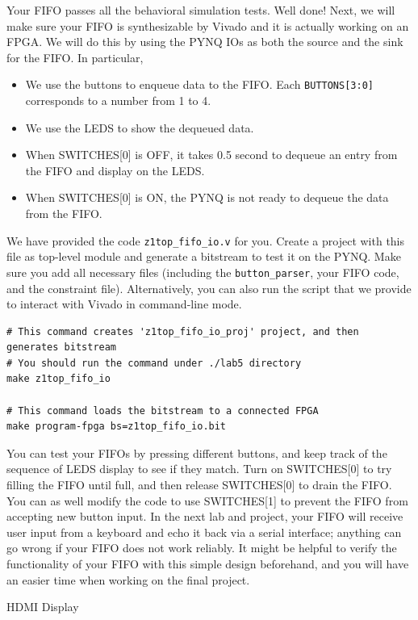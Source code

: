 \documentclass[11pt]{article}
\makeatletter
\renewcommand{\section}
{\@startsection {section}{1}{0pt}
 {-2ex}
 {1ex}
 {\bfseries\Large}}
\makeatother
\begin{document}
Your FIFO passes all the behavioral simulation tests. Well done! Next, we will make sure your FIFO is synthesizable by Vivado and it is actually working on an FPGA. We will do this by using the PYNQ IOs as both the source and the sink for the FIFO. In particular,

\begin{itemize}
    \item We use the buttons to enqueue data to the FIFO. Each \verb|BUTTONS[3:0]| corresponds to a number from 1 to 4.
    \item We use the LEDS to show the dequeued data.
    \item When SWITCHES[0] is OFF, it takes 0.5 second to dequeue an entry from the FIFO and display on the LEDS.
    \item When SWITCHES[0] is ON, the PYNQ is not ready to dequeue the data from the FIFO.
\end{itemize}

We have provided the code \verb|z1top_fifo_io.v| for you. Create a project with this file as top-level module and generate a bitstream to test it on the PYNQ. Make sure you add all necessary files (including the \verb|button_parser|, your FIFO code, and the constraint file). Alternatively, you can also run the script that we provide to interact with Vivado in command-line mode.

\begin{verbatim}
# This command creates 'z1top_fifo_io_proj' project, and then generates bitstream
# You should run the command under ./lab5 directory
make z1top_fifo_io

# This command loads the bitstream to a connected FPGA
make program-fpga bs=z1top_fifo_io.bit
\end{verbatim}

You can test your FIFOs by pressing different buttons, and keep track of the sequence of LEDS display to see if they match. Turn on SWITCHES[0] to try filling the FIFO until full, and then release SWITCHES[0] to drain the FIFO. You can as well modify the code to use SWITCHES[1] to prevent the FIFO from accepting new button input. In the next lab and project, your FIFO will receive user input from a keyboard and echo it back via a serial interface; anything can go wrong if your FIFO does not work reliably. It might be helpful to verify the functionality of your FIFO with this simple design beforehand, and you will have an easier time when working on the final project.


\section{HDMI Display}
\end{document}
